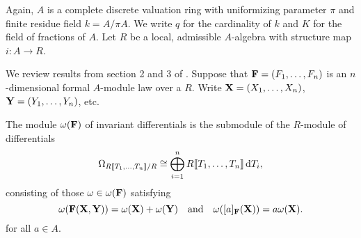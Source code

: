 Again, $A$ is a complete discrete valuation ring with uniformizing parameter 
$\pi$ and finite residue field $k = A/\pi A$. We write $q$ for the cardinality of 
$k$ and $K$ for the field of fractions of $A$. Let $R$ be a local,
admissible $A$-algebra with structure map $i: A \to R$.

We review results from section
2 and 3 of \cite{hopkins1994equivariant}. 
Suppose that $\mathbf{F} = (F_1, \dots, F_n)$ is an $n$-dimensional formal $A$-module
law over a $R$. Write $\mathbf{X} = (X_1, \dots, X_n)$, $\mathbf{Y} = (Y_1,
\dots, Y_n)$, etc.

\begin{defi}
  The module $\omega(\mathbf{F})$ of invariant differentials is the submodule of the
  $R$-module of differentials
  \begin{equation*}
    \Omega_{R\llbracket T_1, \dots, T_n \rrbracket/R} \cong \bigoplus_{i=1}^n R\llbracket T_1, \dots, T_n
    \rrbracket \, \mathrm{d} T_i,
  \end{equation*}
  consisting of those $\omega \in \omega(\mathbf{F})$ satisfying
  \begin{equation}\label{eq:diffcond}
    \omega(\mathbf{F}(\mathbf{X},\mathbf{Y})) = \omega(\mathbf{X}) + \omega(\mathbf{Y})\quad \text{and} \quad
    \omega([a]_{\mathbf{F}}(\mathbf{X})) = a\omega(\mathbf{X}).
  \end{equation} 
  for all $a \in A$. 
\end{defi}

